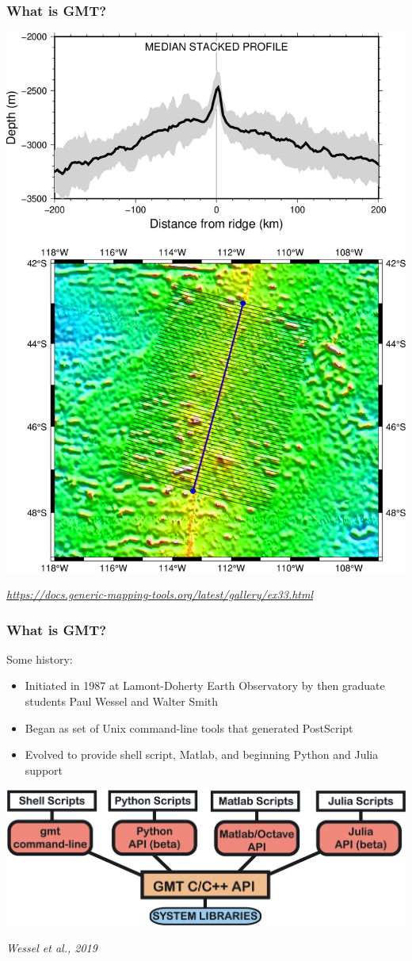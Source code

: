 \documentclass[unknownkeysallowed]{beamer}
\begin{document}
\begin{frame}
\frametitle{What is GMT?}
	\vspace{-0.25cm}
	\begin{center}
		\includegraphics[width=.5\textwidth]{../figures/gmt_ex33.png}	
	\end{center}
	\begin{flushright}
	\vspace{-0.15cm}
	\tiny{\emph{\url{https://docs.generic-mapping-tools.org/latest/gallery/ex33.html}}}
	\end{flushright}	
\end{frame}

\begin{frame}
\frametitle{What is GMT?}
	Some history:
	\begin{itemize}
		\item Initiated in 1987 at Lamont-Doherty Earth Observatory by then graduate students Paul Wessel and Walter Smith
		\item Began as set of Unix command-line tools that generated PostScript
		\item Evolved to provide shell script, Matlab, and beginning Python and Julia support
	\end{itemize}
	\begin{center}
		\includegraphics[width=.5\textwidth]{../figures/gmt_architecture.png}	
	\end{center}
	\begin{flushright}
	\tiny{\emph{Wessel et al., 2019}}
	\end{flushright}	
\end{frame}
\end{document}
